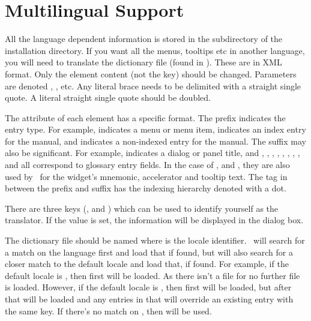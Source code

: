 

\chapter{Multilingual Support}\label{sec:multilingualsupport}

All the language dependent information is stored in the
 subdirectory of the installation directory.
If you want all the menus, tooltips
etc in another language, you will need to translate the
dictionary file (found in ). 
These are in XML format. Only the element content (not the key)
should be changed. Parameters are denoted ,
, etc. Any literal brace needs to be delimited with
a straight single quote. A literal straight single quote should be
doubled.

The  attribute of each  element has a specific
format. The prefix indicates the entry type. For example,
 indicates a menu or menu item,  indicates an
index entry for the manual, and  indicates a
non-indexed entry for the manual.  The suffix may also be
significant. For example,  indicates a dialog or panel
title, and , , ,
, , , ,
, and  all correspond to glossary
entry fields. In the case of ,  and
, they are also used by \FlowframTk\ for the widget's
mnemonic, accelerator and tooltip text.  The tag in between the
prefix and suffix has the indexing hierarchy denoted with a dot.

There are three keys (,
 and )
which can be used to identify yourself as the translator. If
the  value is set, the information will be
displayed in the  dialog box.

The dictionary file should be named
where  is the locale identifier.
\FlowframTk\ will search for a match on the language first
and load that if found, but will also search for a closer match to
the default locale and load that, if found. For example,
if the default locale is , then first
 will be loaded. As there isn't a file
for  no further file is loaded.
However, if the default locale is , then first
 will be loaded, but after that
 will be loaded and any entries in
that will override an existing entry with the same key.
If there's no match on , then 
 will be used.

